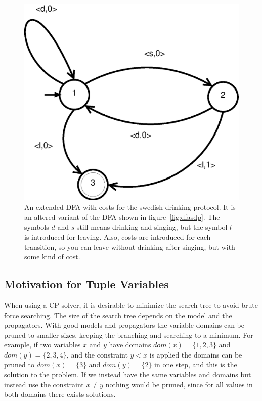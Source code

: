 \documentclass[a4paper,11pt]{article}
\begin{document}
\begin{figure}[H]
\centering
\includegraphics{cdfa.eps}
\caption{An extended DFA with costs for the swedish drinking protocol. It is an altered variant of the DFA shown in figure~\ref{fig:dfasdp}. The symbols $d$ and $s$ still means drinking and singing, but the symbol $l$ is introduced for leaving. Also, costs are introduced for each transition, so you can leave without drinking after singing, but with some kind of cost.}
\label{fig:cdfasdp}
\end{figure}

\subsection{Motivation for Tuple Variables}
When using a CP solver, it is desirable to minimize the search tree to avoid brute force searching. The size of the search tree depends on the model and the propagators. With good models and propagators the variable domains can be pruned to smaller sizes, keeping the branching and searching to a minimum. For example, if two variables $x$ and $y$ have domains $dom(x)=\{1,2,3\}$ and $dom(y)=\{2,3,4\}$, and the constraint $y<x$ is applied the domains can be pruned to $dom(x)=\{3\}$ and $dom(y)=\{2\}$ in one step, and this is the solution to the problem. If we instead have the same variables and domains but instead use the constraint $x\neq y$ nothing would be pruned, since for all values in both domains there exists solutions. 
\end{document}
